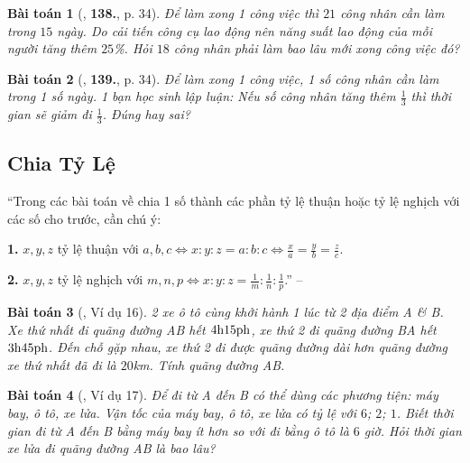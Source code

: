 \documentclass{article}
\numberwithin{equation}{section}
\newtheorem{baitoan}{Bài toán}
\begin{document}
\begin{baitoan}[\cite{Tuyen_Toan_7}, \textbf{138.}, p. 34]
	Để làm xong 1 công việc thì $21$ công nhân cần làm trong $15$ ngày. Do cải tiến công cụ lao động nên năng suất lao động của mỗi người tăng thêm $25$\%. Hỏi $18$ công nhân phải làm bao lâu mới xong công việc đó?
\end{baitoan}

\begin{baitoan}[\cite{Tuyen_Toan_7}, \textbf{139.}, p. 34]
	Để làm xong 1 công việc, 1 số công nhân cần làm trong 1 số ngày. 1 bạn học sinh lập luận: Nếu số công nhân tăng thêm $\frac{1}{3}$ thì thời gian sẽ giảm đi $\frac{1}{3}$. Đúng hay sai?
\end{baitoan}


\subsection{Chia Tỷ Lệ}
``Trong các bài toán về chia 1 số thành các phần tỷ lệ thuận hoặc tỷ lệ nghịch với các số cho trước, cần chú ý:
\begin{enumerate*}
	\item[\textbf{1.}] $x,y,z$ tỷ lệ thuận với $a,b,c\Leftrightarrow x:y:z = a:b:c\Leftrightarrow\frac{x}{a} = \frac{y}{b} = \frac{z}{c}$.
	\item[\textbf{2.}] $x,y,z$ tỷ lệ nghịch với $m,n,p\Leftrightarrow x:y:z = \frac{1}{m}:\frac{1}{n}:\frac{1}{p}$.'' -- \cite{Binh_Toan_7_tap_1}
\end{enumerate*}

\begin{baitoan}[\cite{Binh_Toan_7_tap_1}, Ví dụ 16]
	2 xe ô tô cùng khởi hành 1 lúc từ 2 địa điểm A \& B. Xe thứ nhất đi quãng đường AB hết $\rm4h15ph$, xe thứ 2 đi quãng đường BA hết $\rm3h45ph$. Đến chỗ gặp nhau, xe thứ 2 đi được quãng đường dài hơn quãng đường xe thứ nhất đã đi là $20$\emph{km}. Tính quãng đường AB.
\end{baitoan}

\begin{baitoan}[\cite{Binh_Toan_7_tap_1}, Ví dụ 17]
	Để đi từ A đến B có thể dùng các phương tiện: máy bay, ô tô, xe lửa. Vận tốc của máy bay, ô tô, xe lửa có tỷ lệ với $6$; $2$; $1$. Biết thời gian đi từ A đến B bằng máy bay ít hơn so với đi bằng ô tô là $6$ giờ. Hỏi thời gian xe lửa đi quãng đường AB là bao lâu?
\end{baitoan}
\end{document}
